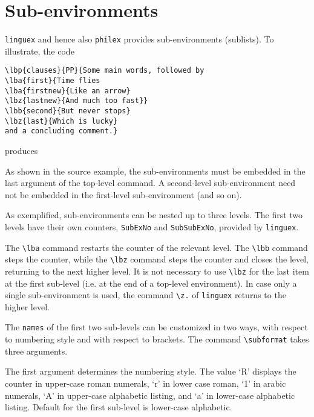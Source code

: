 \documentclass[11pt]{article}
\newcommand{\qut}[1]{`#1'}
\begin{document}
\section{Sub-environments}
\verb+linguex+ and  hence also \verb+philex+ provides sub-environments (sublists). To illustrate, the code

\begin{verbatim}
\lbp{clauses}{PP}{Some main words, followed by 
\lba{first}{Time flies
\lba{firstnew}{Like an arrow} 
\lbz{lastnew}{And much too fast}}
\lbb{second}{But never stops}
\lbz{last}{Which is lucky}
and a concluding comment.}
\end{verbatim}
produces

	As shown in the source example, the sub-environments must be embedded in the last argument of the top-level command. A second-level sub-environment need not be embedded in the first-level sub-environment (and so on).
	
As exemplified, sub-environments can be nested up to three levels. The first two levels have their own counters, \verb+SubExNo+ and \verb+SubSubExNo+, provided by \verb+linguex+.
	
The \verb+\lba+ command restarts the counter of the relevant level. The \verb+\lbb+ command steps the counter, while the \verb+\lbz+ command steps the counter and closes the level, returning to the next higher level. It is not necessary to use \verb+\lbz+ for the last item at the first sub-level (i.e. at the end of a top-level environment). In case only a single sub-environment is used, the command \verb+\z.+ of \verb+linguex+ returns to the higher level.

The \verb+names+ of the first two sub-levels can be  customized in two ways, with respect to numbering style and with respect to brackets. The command \verb+\subformat+ takes three arguments. 

The first argument determines the numbering style. The value \qut{R} displays the counter in upper-case roman numerals, \qut{r} in lower case roman, \qut{1} in arabic numerals, \qut{A} in upper-case alphabetic listing, and \qut{a} in lower-case alphabetic listing. Default for the first sub-level is lower-case alphabetic.
\end{document}
